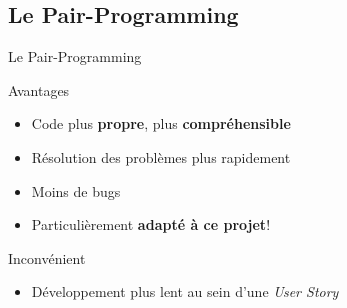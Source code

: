 \FlorentSpeak
\subsection{Le Pair-Programming}
\begin{frame}{Le Pair-Programming}
	\begin{exampleblock}{Avantages}
		\begin{itemize}
			\item Code plus \textbf{propre}, plus \textbf{compréhensible}
			\item Résolution des problèmes plus rapidement
			\item Moins de bugs
			\item Particulièrement \textbf{adapté à ce projet}!
		\end{itemize}
	\end{exampleblock}
	\pause
	\vfill
	\begin{alertblock}{Inconvénient}
		\begin{itemize}
			\item Développement plus lent au sein d'une \textit{User Story}
		\end{itemize}
	\end{alertblock}
\end{frame}
	
